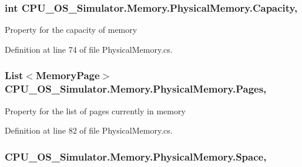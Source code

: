\subsubsection[{Capacity}]{\setlength{\rightskip}{0pt plus 5cm}int C\+P\+U\+\_\+\+O\+S\+\_\+\+Simulator.\+Memory.\+Physical\+Memory.\+Capacity\hspace{0.3cm}{\ttfamily [get]}, {\ttfamily [set]}}\label{class_c_p_u___o_s___simulator_1_1_memory_1_1_physical_memory_af04d50462367295af1c8b4f9f1a75730}


Property for the capacity of memory 



Definition at line 74 of file Physical\+Memory.\+cs.

\hypertarget{class_c_p_u___o_s___simulator_1_1_memory_1_1_physical_memory_ad099afa411ad366a734457fd824fea06}{}
\subsubsection[{Pages}]{\setlength{\rightskip}{0pt plus 5cm}List$<${\bf Memory\+Page}$>$ C\+P\+U\+\_\+\+O\+S\+\_\+\+Simulator.\+Memory.\+Physical\+Memory.\+Pages\hspace{0.3cm}{\ttfamily [get]}, {\ttfamily [set]}}\label{class_c_p_u___o_s___simulator_1_1_memory_1_1_physical_memory_ad099afa411ad366a734457fd824fea06}


Property for the list of pages currently in memory 



Definition at line 82 of file Physical\+Memory.\+cs.

\hypertarget{class_c_p_u___o_s___simulator_1_1_memory_1_1_physical_memory_a5d0fceb09f51edcfb4f483b5e8a9508a}{}
\subsubsection[{Space}]{ C\+P\+U\+\_\+\+O\+S\+\_\+\+Simulator.\+Memory.\+Physical\+Memory.\+Space\hspace{0.3cm}{\ttfamily [get]}, {\ttfamily [set]}}\label{class_c_p_u___o_s___simulator_1_1_memory_1_1_physical_memory_a5d0fceb09f51edcfb4f483b5e8a9508a}


